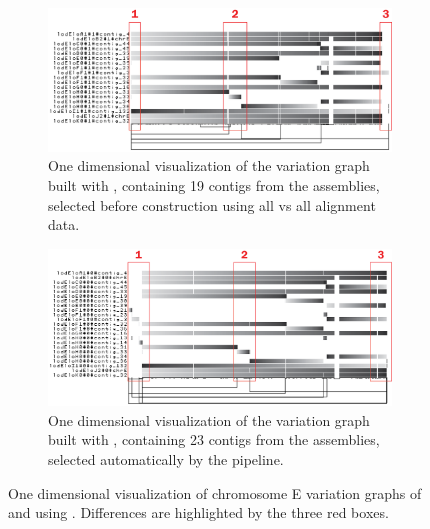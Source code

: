 \begin{figure}[t]
	\centering
	\begin{subfigure}[b]{\textwidth}
		\centering
		\includegraphics[width=\linewidth]{figures/lodelo/chrE.pggb.png}
		\caption{One dimensional visualization of the variation graph built with \pggb, containing 19 contigs from the assemblies, selected before construction using all vs all alignment data.}
		\label{fig:chrE_pggb}
	\end{subfigure}%

	\begin{subfigure}[b]{\textwidth}
		\centering
		\includegraphics[width=\linewidth]{figures/lodelo/chrE.mcactus.png}
		\caption{One dimensional visualization of the variation graph built with \mcactus, containing 23 contigs from the assemblies, selected automatically by the pipeline.}
		\label{fig:chrE_mcactus}
	\end{subfigure}
	\caption[1D visualization of differences between \pggb and \mcactus output.]{One dimensional visualization of chromosome E variation graphs of \pggb and \mcactus using \odgi. Differences are highlighted by the three red boxes.}
	\label{fig:chrE_difference}
\end{figure}

